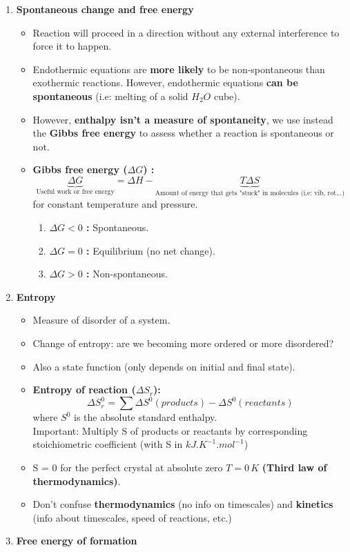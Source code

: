 \documentclass[a4paper,11pt]{article}
\begin{document}
\begin{enumerate}
\begin{itemize}
        \end{itemize}
    \item \textbf{Spontaneous change and free energy}
        \begin{itemize}
        \item Reaction will proceed in a direction without any external interference to force it to happen.
        \item Endothermic equations are \textbf{more likely} to be non-spontaneous than exothermic reactions. However, endothermic equations \textbf{can be spontaneous} (i.e: melting of a solid $H_2O$ cube).
        \item However, \textbf{enthalpy isn't a measure of spontaneity}, we use instead the \textbf{Gibbs free energy} to assess whether a reaction is spontaneous or not.
        \item \textbf{Gibbs free energy ($\Delta G$) :}
        \[\underbrace{\Delta G}_\textrm{Useful work or free energy} = \Delta H - \underbrace{T \Delta S}_\textrm{Amount of energy that gets "stuck" in molecules (i.e: vib, rot...)}\]
        for constant temperature and pressure.
            \begin{enumerate}
                \item \textbf{$\Delta G < 0$ :} Spontaneous.
                \item \textbf{$\Delta G = 0$ :} Equilibrium (no net change).
                \item \textbf{$\Delta G > 0$ :} Non-spontaneous.
            \end{enumerate}
        \end{itemize}
    \item \textbf{Entropy}
        \begin{itemize}
            \item Measure of disorder of a system.
            \item Change of entropy: are we becoming more ordered or more disordered?
            \item Also a state function (only depends on initial and final state).
            \item \textbf{Entropy of reaction ($\Delta S_r$):}
            \[\Delta S_r^0 = \sum \Delta S^0(products) - \Delta S^0(reactants)\] 
            where $S^0$ is the absolute standard enthalpy.\\
            Important: Multiply S of products or reactants by corresponding stoichiometric coefficient (with S in $kJ.K^{-1}.mol^{-1}$)
            \item S = 0 for the perfect crystal at absolute zero $T=0\,K$ \textbf{(Third law of thermodynamics)}.
            \item Don't confuse \textbf{thermodynamics} (no info on timescales) and \textbf{kinetics} (info about timescales, speed of reactions, etc.)
        \end{itemize}
    \item \textbf{Free energy of formation}
          

\end{enumerate}
\end{document}
